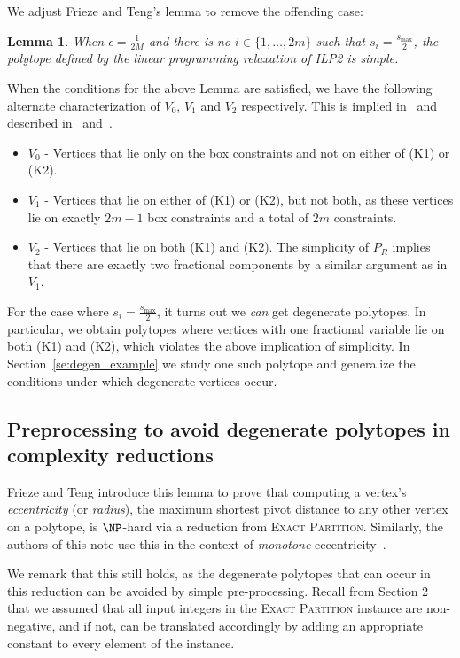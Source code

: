 \documentclass[10pt,a4paper]{amsart}
\newtheorem{lemma}[theorem]{Lemma}
\begin{document}
We adjust Frieze and Teng's lemma to remove the offending case:

\begin{lemma}\label{new}
    When \(\epsilon = \frac{1}{2M}\) and there is no $i \in \{1,\ldots,2m\}$ such that $s_i = \frac{s_{\max}}{2}$, the polytope defined by the linear programming relaxation of ILP2 is simple.
\end{lemma}


When the conditions for the above Lemma are satisfied, we have the following alternate characterization of $V_0$, $V_1$ and $V_2$ respectively. This is implied in~\cite{FT94} and described in~\cite{KN25} and~\cite{NS26}.

\begin{itemize}
    \item $V_0$ - Vertices that lie only on the box constraints and not on either of (K1) or (K2).
    \item $V_1$ - Vertices that lie on either of (K1) or (K2), but not both, as these vertices lie on exactly $2m-1$ box constraints and a total of $2m$ constraints. 
    \item $V_2$ - Vertices that lie on both (K1) and (K2). The simplicity of $P_R$ implies that there are exactly two fractional components by a similar argument as in $V_1$. 
\end{itemize}

For the case where $s_i = \frac{s_{\max}}{2}$, it turns out we \emph{can} get degenerate polytopes. In particular, we obtain polytopes where vertices with one fractional variable lie on both (K1) and (K2), which violates the above implication of simplicity. In Section~\ref{se:degen_example} we study one such polytope and generalize the conditions under which degenerate vertices occur.  

\subsection{Preprocessing to avoid degenerate polytopes in complexity reductions}

Frieze and Teng introduce this lemma to prove that computing a vertex's \emph{eccentricity} (or \emph{radius}), the maximum shortest pivot distance to any other vertex on a polytope, is $\NP$-hard via a reduction from \textsc{Exact Partition}.  Similarly, the authors of this note use this in the context of \emph{monotone} eccentricity~\cite{NS26}. 

We remark that this still holds, as the degenerate polytopes that can occur in this reduction can be avoided by simple pre-processing.
Recall from Section 2 that we assumed that all input integers in the \textsc{Exact Partition} instance are non-negative, and if not, can be translated accordingly by adding an appropriate constant to every element of the instance. 
\end{document}
